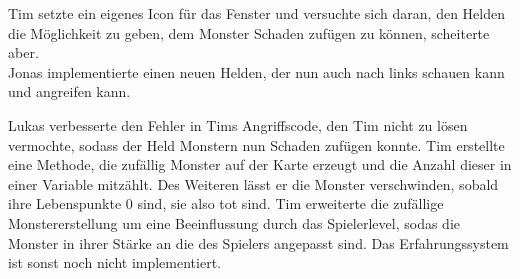 
Tim setzte ein eigenes Icon für das Fenster und versuchte sich daran, den Helden die Möglichkeit zu geben, dem Monster Schaden zufügen zu können, scheiterte aber. \\
Jonas implementierte einen neuen Helden, der nun auch nach links schauen kann und angreifen kann.


Lukas verbesserte den Fehler in Tims \glqq{}Angriffscode\grqq{}, den Tim nicht zu lösen vermochte, sodass der Held Monstern nun Schaden zufügen konnte.
Tim erstellte eine Methode, die zufällig Monster auf der Karte erzeugt und die Anzahl dieser in einer Variable mitzählt. Des Weiteren lässt er die Monster verschwinden, sobald ihre Lebenspunkte 0 sind, sie also tot sind. Tim erweiterte die zufällige Monstererstellung um eine Beeinflussung durch das Spielerlevel, sodas die Monster in ihrer Stärke an die des Spielers angepasst sind. Das Erfahrungssystem ist sonst noch nicht implementiert. \\


